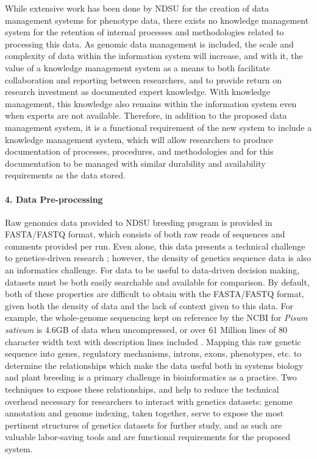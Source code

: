 \documentclass[12pt, letterpaper,oneocolumn]{article}
\begin{document}
While extensive work has been done by NDSU for the creation of data management systems for phenotype data, there exists no knowledge management system for the retention of internal processes and methodologies related to processing this data. As genomic data management is included, the scale and complexity of data within the information system will increase, and with it, the value of a knowledge management system as a means to both facilitate collaboration and reporting between researchers, and to provide return on research investment as documented expert knowledge. With knowledge management, this knowledge also remains within the information system even when experts are not available. Therefore, in addition to the proposed data management system, it is a functional requirement of the new system to include a knowledge management system, which will allow researchers to produce documentation of processes, procedures, and methodologies and for this documentation to be managed with similar durability and availability requirements as the data stored.

\paragraph{4. Data Pre-processing}
Raw genomics data provided to NDSU breeding program is provided in FASTA/FASTQ format, which consists of both raw reads of sequences and comments provided per run. Even alone, this data presents a technical challenge to genetics-driven research \cite{EJ910}; however, the density of genetics sequence data is also an informatics challenge. For data to be useful to data-driven decision making, datasets must be both easily searchable and available for comparison. By default, both of these properties are difficult to obtain with the FASTA/FASTQ format, given both the density of data and the lack of context given to this data. For example, the whole-genome sequencing kept on reference by the NCBI for \emph{Pisum sativum} is 4.6GB of data when uncompressed, or over 61 Million lines of 80 character width text with description lines included \cite{pea_genome}. Mapping this raw genetic sequence into genes, regulatory mechanisms, introns, exons, phenotypes, etc. to determine the relationships which make the data useful both in systems biology and plant breeding is a primary challenge in bioinformatics as a practice. Two techniques to expose these relationships, and help to reduce the technical overhead necessary for researchers to interact with genetics datasets: genome annotation and genome indexing, taken together, serve to expose the most pertinent structures of genetics datasets for further study, and as such are valuable labor-saving tools and are functional requirements for the proposed system.
\end{document}
